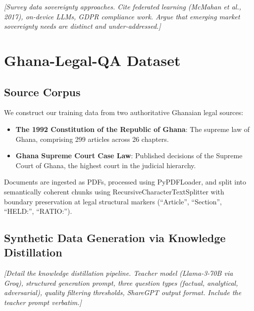 \documentclass[11pt]{article}
\begin{document}
\textit{[Survey data sovereignty approaches. Cite federated learning
(McMahan et al., 2017), on-device LLMs, GDPR compliance work.
Argue that emerging market sovereignty needs are distinct and
under-addressed.]}


\section{Ghana-Legal-QA Dataset}
\label{sec:data}

\subsection{Source Corpus}

We construct our training data from two authoritative Ghanaian legal
sources:

\begin{itemize}
    \item \textbf{The 1992 Constitution of the Republic of Ghana}:
    The supreme law of Ghana, comprising 299 articles across 26 chapters.

    \item \textbf{Ghana Supreme Court Case Law}: Published decisions of
    the Supreme Court of Ghana, the highest court in the judicial
    hierarchy.
\end{itemize}

Documents are ingested as PDFs, processed using PyPDFLoader, and split
into semantically coherent chunks using RecursiveCharacterTextSplitter
with boundary preservation at legal structural markers
(``Article'', ``Section'', ``HELD:'', ``RATIO:'').

\subsection{Synthetic Data Generation via Knowledge Distillation}
\label{sec:sdg}


\textit{[Detail the knowledge distillation pipeline. Teacher model
(Llama-3-70B via Groq), structured generation prompt, three question
types (factual, analytical, adversarial), quality filtering thresholds,
ShareGPT output format. Include the teacher prompt verbatim.]}
\end{document}
